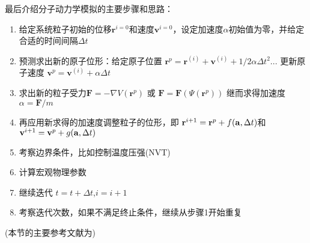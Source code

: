 最后介绍分子动力学模拟的主要步骤和思路：
\begin{enumerate}
	\item 给定系统粒子初始的位移$\mathbf{r}^{i=0}$和速度$\mathbf{v}^{i=0}$，设定加速度$\alpha$初始值为零，并给定合适的时间间隔$\Delta t$
	\item 预测求出新的原子位形：给定原子位置 $\mathbf{r}^p = \mathbf{r}^{(i)}+ \mathbf{v}^{(i)} + 1/2 \alpha \Delta t^2 ...$ 更新原子速度 $\mathbf{v}^p = \mathbf{v}^{(i)}+\alpha \Delta t$
	\item 求出新的粒子受力$\mathbf{F} = - \nabla V(\mathbf{r}^p)$  或 $\mathbf{F} = \mathbf{F}( \Psi(\mathbf{r}^p))$ 继而求得加速度$\alpha = \mathbf{F}/m$
	\item 再应用新求得的加速度调整粒子的位形，即
	$\mathbf{r}^{i+1} = \mathbf{r}^p + \mathnormal{f}(\mathbf{a}, \Delta t)$和$\mathbf{v}^{i+1} = \mathbf{v}^p + \mathnormal{g}(\mathbf{a}, \Delta t)$
	\item 考察边界条件，比如控制温度压强(NVT)
	\item 计算宏观物理参数
	\item 继续迭代 $t=t+ \Delta t$,$i=i+1$
	\item 考察迭代次数，如果不满足终止条件，继续从步骤1开始重复
\end{enumerate}
(本节的主要参考文献为\cite{Frenkel1997Understanding,Rapaport2004The,Berendsen1998Molecular,Swope1982A})

